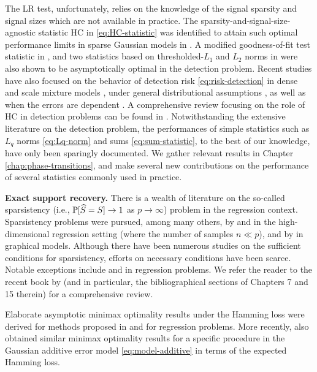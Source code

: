 The \ac{LR} test, unfortunately, relies on the knowledge of the signal sparsity and signal sizes which are 
not available in practice. The sparsity-and-signal-size-agnostic statistic \ac{HC} in \eqref{eq:HC-statistic} was identified 
to attain such optimal performance limits in sparse Gaussian models in \cite{donoho2004higher}. 
A modified goodness-of-fit test statistic in \citet{zhang2002powerful}, and two statistics based on thresholded-$L_1$ and $L_2$ norms in \cite{zhong2013tests} were also shown to be asymptotically optimal in the detection problem.
Recent studies have also focused on the behavior of detection risk \eqref{eq:risk-detection} in dense and scale mixture models \cite{cai2011optimal}, under general distributional assumptions \citep{cai2014optimal, arias2017distribution1}, as well as when the errors are dependent \citep{hall2010innovated}.
A comprehensive review focusing on the role of \ac{HC} in detection problems can be found in \cite{donoho2015special}.
Notwithstanding the extensive literature on the detection problem, the performances of simple statistics such as 
$L_q$ norms \eqref{eq:Lq-norm} and sums \eqref{eq:sum-statistic}, to the best of our knowledge, have only been 
sparingly documented.  We gather relevant results in Chapter \ref{chap:phase-transitions}, and make several new 
contributions on the performance of several statistics commonly used in practice.

\medskip

{\bf Exact support recovery.}
There is a wealth of literature on the so-called sparsistency (i.e., $\P[\widehat{S} = S]\to 1$ as $p\to\infty$) problem in the regression context. 
Sparsistency problems were pursued, among many others, by \citet{zhao2006model} and \citet{wasserman2009high} in the high-dimensional regression setting (where the number of samples $n\ll p$), and by \citet*{meinshausen2006high} in graphical models.
Although there have been numerous studies on the sufficient conditions for sparsistency, efforts on necessary conditions have been scarce.
Notable exceptions include \cite{wainwright2009information, wainwright2009sharp} and \cite{comminges2012tight} in regression problems.
We refer the reader to the recent book by \cite{wainwright2019high} (and in particular, the bibliographical sections of Chapters 7 and 15 therein) for a comprehensive review.

Elaborate asymptotic minimax optimality results under the Hamming loss were derived for methods proposed in \cite{ji2012ups} and \cite{jin2014optimality} for regression problems.
More recently, \cite{butucea2018variable} also obtained similar minimax optimality results for a specific procedure in the Gaussian additive error model \eqref{eq:model-additive} in terms of the expected Hamming loss.

